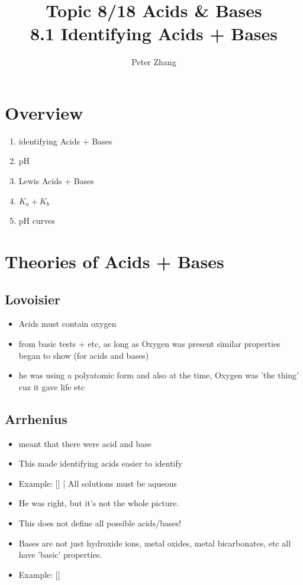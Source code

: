 \documentclass{article}
\title{Topic 8/18 Acids \& Bases\\8.1 Identifying Acids + Bases}
\author{Peter Zhang}
\begin{document}
\maketitle
\tableofcontents
\newpage


\section{Overview}
\begin{enumerate}
\item identifying Acids + Bases
\item pH
\item Lewis Acids + Bases
\item $K_{a} + K_{b}$
\item pH curves
\end{enumerate}

\section{Theories of Acids + Bases}
\subsection{Lovoisier}
\begin{itemize} \item Acids must contain oxygen \item from basic tests + etc, as long as Oxygen was present similar properties began to show (for acids and bases) \item he was using a polyatomic form and also at the time, Oxygen was 'the thing' cuz it gave life etc \end{itemize}
\subsection{Arrhenius}
\begin{itemize} \item {} meant that there were acid and base \item This made identifying acids easier to identify \item Example: [] | All solutions must be aqueous \item He was right, but it's not the whole picture. \item This does not define all possible acids/bases! \item Bases are not just hydroxide ions, metal oxides, metal bicarbonates, etc all have 'basic' properties. \item Example: [] \end{itemize}
\end{document}

